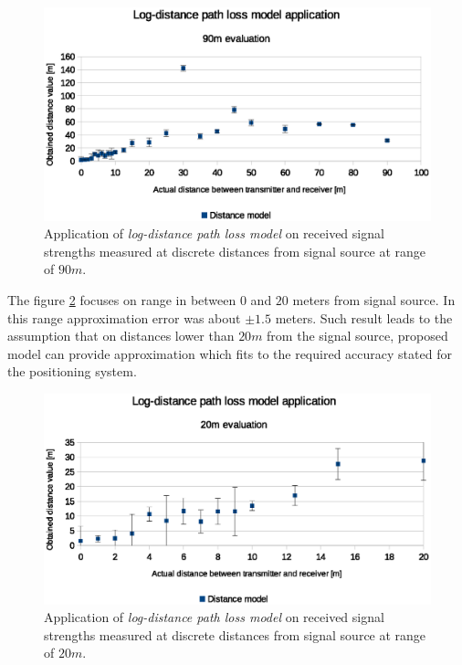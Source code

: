 \documentclass[../main.tex]{subfiles}
\begin{document}
\begin{figure}[!htbp]
\includegraphics[width=\textwidth, keepaspectratio]{pictures/tests_case1_distance_model_90m}
\centering
\caption{Application of \textit{log-distance path loss model} on received signal strengths measured at discrete distances from signal source at range of $90m$.}
\label{fig:tests_case1_distance_model_90m}
\end{figure}


The figure \ref{fig:tests_case1_distance_model_20m} focuses on range in between $0$ and $20$ meters from signal source. In this range approximation error was about $\pm 1.5$ meters. Such result leads to the assumption that on distances lower than $20m$ from the signal source, proposed model can provide approximation which fits to the required accuracy stated for the positioning system.

\begin{figure}[!htbp]
\includegraphics[width=\textwidth, keepaspectratio]{pictures/tests_case1_distance_model_20m}
\centering
\caption{Application of \textit{log-distance path loss model} on received signal strengths measured at discrete distances from signal source at range of $20m$.}
\label{fig:tests_case1_distance_model_20m}
\end{figure}
\end{document}
